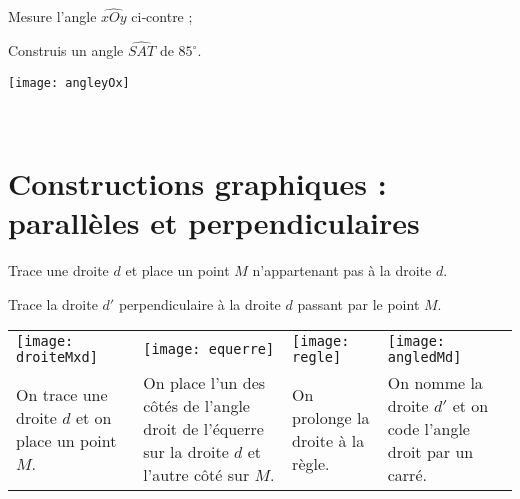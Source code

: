 \begin{methode*1}
\exercice
 \begin{enumerate}
 \begin{minipage}[c]{0.36\textwidth}
  \item Mesure l'angle $\widehat{xOy}$ ci‑contre ;
  \item Construis un angle $\widehat{SAT}$ de $85^\circ$. 
  \end{minipage} \hfill%
 \begin{minipage}[c]{0.56\textwidth}
  \texttt{[image: angleyOx]} 
  \end{minipage} \\
  \end{enumerate}
 
\end{methode*1}


\section{Constructions graphiques : parallèles et perpendiculaires}

\begin{methode*1}

\begin{exemple*1}
Trace une droite $d$ et place un point $M$ n'appartenant pas à la droite $d$.

Trace la droite $d'$ perpendiculaire à la droite $d$ passant par le point $M$. \\[0.75em]

\begin{tabularx}{\textwidth}{X|X|X|X}
 \texttt{[image: droiteMxd]} &  \texttt{[image: equerre]} & \texttt{[image: regle]} &  \texttt{[image: angledMd]}\\ 
 On trace une droite $d$ et on place un point $M$. & On place l'un des côtés de l'angle droit de l'équerre sur la droite $d$ et l'autre côté sur $M$.
 & On prolonge la droite à la règle. & On nomme la droite $d'$ et on code l'angle droit par un carré.\\

\end{tabularx} \\
 
 \end{exemple*1}


\exercice %


 
\end{methode*1}

